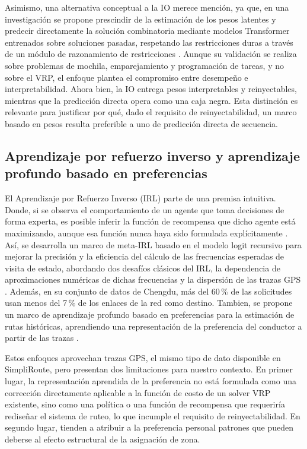 Asimismo, una alternativa conceptual a la IO merece mención, ya que, en una investigación se propone prescindir de la estimación de los pesos latentes y predecir directamente la solución combinatoria mediante modelos Transformer entrenados sobre soluciones pasadas, respetando las restricciones duras a través de un módulo de razonamiento de restricciones \cite{navarro2024inverse}. Aunque su validación se realiza sobre problemas de mochila, emparejamiento y programación de tareas, y no sobre el VRP, el enfoque plantea el compromiso entre desempeño e interpretabilidad. Ahora bien, la IO entrega pesos interpretables y reinyectables, mientras que la predicción directa opera como una caja negra. Esta distinción es relevante para justificar por qué, dado el requisito de reinyectabilidad, un marco basado en pesos resulta preferible a uno de predicción directa de secuencia.

\subsection{Aprendizaje por refuerzo inverso y aprendizaje profundo basado en preferencias}

El Aprendizaje por Refuerzo Inverso (IRL) parte de una premisa intuitiva. Donde, si se observa el comportamiento de un agente que toma decisiones de forma experta, es posible inferir la función de recompensa que dicho agente está maximizando, aunque esa función nunca haya sido formulada explícitamente \cite{ng2000algorithms}. Así, se  desarrolla un marco de meta-IRL basado en el modelo logit recursivo para mejorar la precisión y la eficiencia del cálculo de las frecuencias esperadas de visita de estado, abordando dos desafíos clásicos del IRL, la dependencia de aproximaciones numéricas de dichas frecuencias y la dispersión de las trazas GPS \cite{zhang2024recursive}. Además, en su conjunto de datos de Chengdu, más del 60\,\% de las solicitudes usan menos del 7\,\% de los enlaces de la red como destino. Tambien, se propone un marco de aprendizaje profundo basado en preferencias para la estimación de rutas históricas, aprendiendo una representación de la preferencia del conductor a partir de las trazas  \cite{pan2025preference}.

Estos enfoques aprovechan trazas GPS, el mismo tipo de dato disponible en SimpliRoute, pero presentan dos limitaciones para nuestro contexto. En primer lugar, la representación aprendida de la preferencia no está formulada como una corrección directamente aplicable a la función de costo de un solver VRP existente, sino como una política o una función de recompensa que requeriría rediseñar el sistema de ruteo, lo que incumple el requisito de reinyectabilidad. En segundo lugar, tienden a atribuir a la preferencia personal patrones que pueden deberse al efecto estructural de la asignación de zona.

